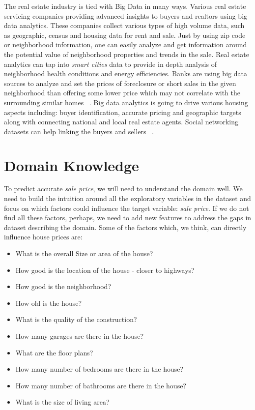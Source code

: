 \documentclass[sigconf]{acmart}
\begin{document}
    The real estate industry is tied with Big Data in many ways. Various real estate servicing companies providing advanced insights to buyers and realtors using big data analytics. These companies collect various types of high volume data, such as geographic, census and housing data for rent and sale. Just by using zip code or neighborhood information, one can easily analyze and get information around the potential value of neighborhood properties and trends in the sale. Real estate analytics can tap into {\em smart cities} data to provide in depth analysis of neighborhood health conditions and energy efficiencies. Banks are using big data sources to analyze and set the prices of foreclosure or short sales in the given neighborhood than offering some lower price which may not correlate with the surrounding similar homes ~\cite{james-2017}. Big data analytics is going to drive various housing aspects including: buyer identification, accurate pricing and geographic targets ~\cite{athena-snow-2017} along with connecting national and local real estate agents. Social networking datasets can help linking the buyers and sellers ~\cite{young-2017}. 

	\section{Domain Knowledge}
	 To predict accurate {\em sale price}, we will need to understand the domain well. We need to build the intuition around all the exploratory variables in the dataset and focus on which factors could influence the target variable: {\em sale price}. If we do not find all these factors, perhaps, we need to add new features to address the gaps in dataset describing the domain. Some of the factors which, we think, can directly influence house prices are:
	 
	 \begin{itemize}
	 	\item What is the overall Size or area of the house?
	 	\item How good is the location of the house - closer to highways?
	 	\item How good is the neighborhood?
	 	\item How old is the house?
	 	\item What is the quality of the construction?
	 	\item How many garages are there in the house?
	 	\item What are the floor plans?
	 	\item How many number of bedrooms are there in the house?
	 	\item How many number of bathrooms are there in the house?
	 	\item What is the size of living area?
	 \end{itemize}
	
\end{document}
